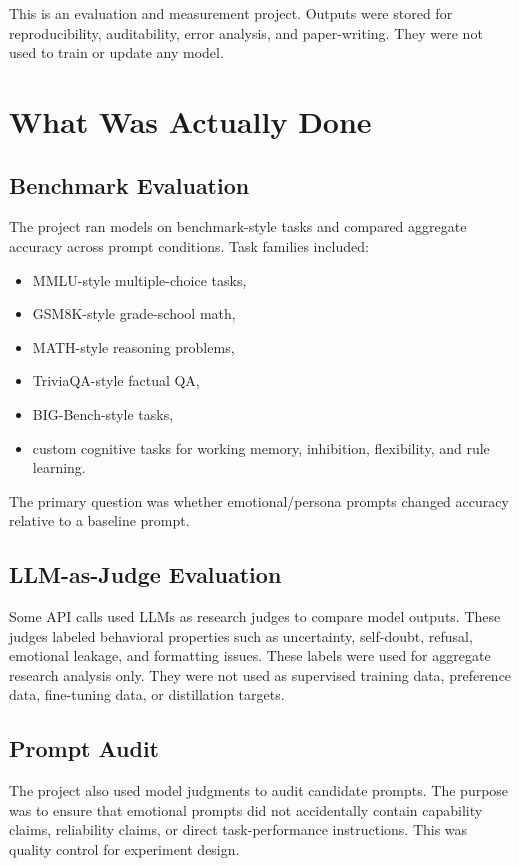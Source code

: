 \documentclass[11pt]{article}
\begin{document}
This is an evaluation and measurement project. Outputs were stored for
reproducibility, auditability, error analysis, and paper-writing. They were not
used to train or update any model.

\section{What Was Actually Done}

\subsection{Benchmark Evaluation}

The project ran models on benchmark-style tasks and compared aggregate accuracy
across prompt conditions. Task families included:

\begin{itemize}
  \item MMLU-style multiple-choice tasks,
  \item GSM8K-style grade-school math,
  \item MATH-style reasoning problems,
  \item TriviaQA-style factual QA,
  \item BIG-Bench-style tasks,
  \item custom cognitive tasks for working memory, inhibition, flexibility, and rule learning.
\end{itemize}

The primary question was whether emotional/persona prompts changed accuracy
relative to a baseline prompt.

\subsection{LLM-as-Judge Evaluation}

Some API calls used LLMs as research judges to compare model outputs. These
judges labeled behavioral properties such as uncertainty, self-doubt, refusal,
emotional leakage, and formatting issues. These labels were used for aggregate
research analysis only. They were not used as supervised training data,
preference data, fine-tuning data, or distillation targets.

\subsection{Prompt Audit}

The project also used model judgments to audit candidate prompts. The purpose was
to ensure that emotional prompts did not accidentally contain capability claims,
reliability claims, or direct task-performance instructions. This was quality
control for experiment design.
\end{document}
